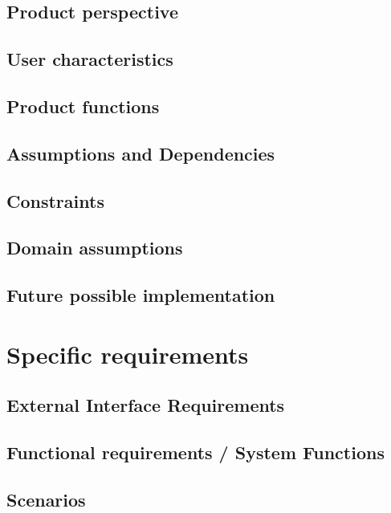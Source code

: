 \documentclass[12pt, a4paper]{article}
\begin{document}
	\subsection{Product perspective}

	
	\subsection{User characteristics}

	
	\subsection{Product functions}

	
	\subsection{Assumptions and Dependencies}

	
	\subsection{Constraints}
	
	\subsection{Domain assumptions}

	
	\subsection{Future possible implementation}


\newpage
\section{Specific requirements}
	\subsection{External Interface Requirements}
	
	\subsection{Functional requirements / System Functions}
	
	\subsection{Scenarios}
\end{document}
